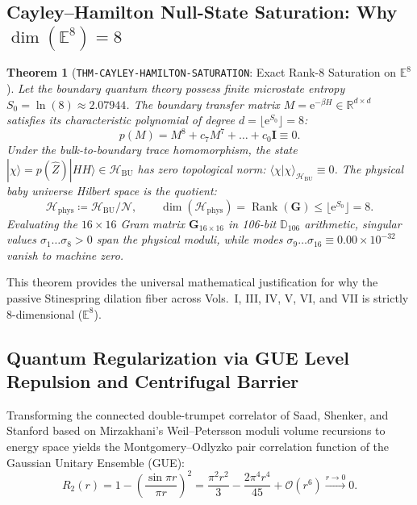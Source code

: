 \documentclass[11pt,a4paper,reqno]{article}
\theoremstyle{plain}
\newtheorem{theorem}{Theorem}[section]
\theoremstyle{definition}
\theoremstyle{remark}
\numberwithin{equation}{section}
\numberwithin{table}{section}
\newcommand{\Ddd}{\mathbb{D}_{106}}
\newcommand{\Hbu}{\mathcal{H}_{\mathrm{BU}}}
\newcommand{\Hphys}{\mathcal{H}_{\mathrm{phys}}}
\newcommand{\HH}{|HH\rangle}
\newcommand{\Zop}{\widehat{Z}}
\DeclareMathOperator{\Rank}{Rank}
\begin{document}
\subsection{Cayley--Hamilton Null-State Saturation: Why \texorpdfstring{$\dim(\mathbb{E}^8) = 8$}{dim(E8) = 8}}
\begin{theorem}[\texttt{THM-CAYLEY-HAMILTON-SATURATION}: Exact Rank-8 Saturation on $\mathbb{E}^8$]
\label{thm:cayley_hamilton_saturation_master}
Let the boundary quantum theory possess finite microstate entropy $S_0 = \ln(8) \approx 2.07944$. The boundary transfer matrix $M = \mathrm{e}^{-\beta H} \in \mathbb{R}^{d \times d}$ satisfies its characteristic polynomial of degree $d = \lfloor \mathrm{e}^{S_0} \rfloor = 8$:
\begin{equation}
  p(M) = M^8 + c_7 M^7 + \dots + c_0 \bm{I} \equiv 0.
\end{equation}
Under the bulk-to-boundary trace homomorphism, the state $|\chi\rangle = p(\Zop)\HH \in \Hbu$ has zero topological norm: $\langle \chi | \chi \rangle_{\Hbu} \equiv 0$. The physical baby universe Hilbert space is the quotient:
\begin{equation}
  \Hphys \coloneqq \Hbu / \mathcal{N}, \qquad \dim(\Hphys) = \Rank(\mathbf{G}) \le \lfloor \mathrm{e}^{S_0} \rfloor = 8.
\end{equation}
Evaluating the $16 \times 16$ Gram matrix $\mathbf{G}_{16 \times 16}$ in 106-bit $\Ddd$ arithmetic, singular values $\sigma_1 \dots \sigma_8 > 0$ span the physical moduli, while modes $\sigma_9 \dots \sigma_{16} \equiv 0.00 \times 10^{-32}$ vanish to machine zero.
\end{theorem}

This theorem provides the universal mathematical justification for why the passive Stinespring dilation fiber across Vols.~I, III, IV, V, VI, and VII is strictly 8-dimensional ($\mathbb{E}^8$).

\subsection{Quantum Regularization via GUE Level Repulsion and Centrifugal Barrier}
Transforming the connected double-trumpet correlator of Saad, Shenker, and Stanford \cite{SaadShenkerStanford2019} based on Mirzakhani's Weil--Petersson moduli volume recursions \cite{Mirzakhani2007} to energy space yields the Montgomery--Odlyzko pair correlation function of the Gaussian Unitary Ensemble (GUE):
\begin{equation}
  R_2(r) = 1 - \left( \frac{\sin\pi r}{\pi r} \right)^2 = \frac{\pi^2 r^2}{3} - \frac{2\pi^4 r^4}{45} + \mathcal{O}(r^6) \xrightarrow{r \to 0} 0.
  \label{eq:gue_level_repulsion}
\end{equation}
\end{document}
